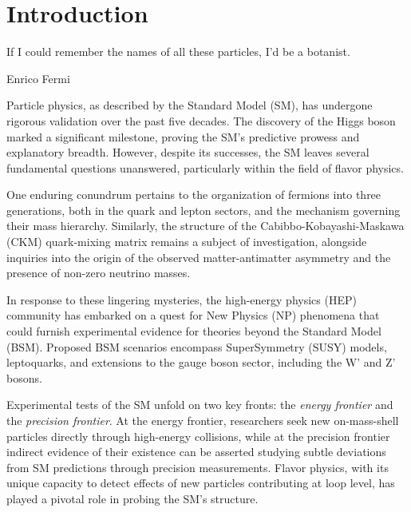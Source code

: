 \renewcommand{\chaptermark}[1]{\markboth{#1}{}}
\renewcommand{\sectionmark}[1]{\markright{#1}}
\fancyhead{} %
\fancyhead[LE]{\chaptername~\thechapter | \leftmark}
\fancyhead[RO]{\thesection~\rightmark}
\fancyfoot{} %
\fancyfoot[LE,RO]{\thepage}

    
\chapter{Introduction}
\label{chp:intro}
\epigraph{If I could remember the names of all these particles, I'd be a botanist.}{Enrico Fermi}

Particle physics, as described by the Standard Model (SM), has undergone rigorous validation over the past five decades. The discovery of the Higgs boson\cite{Aad_2012, Chatrchyan_2012} marked a significant milestone, proving the SM's predictive prowess and explanatory breadth. However, despite its successes, the SM leaves several fundamental questions unanswered, particularly within the field of flavor physics.

One enduring conundrum pertains to the organization of fermions into three generations, both in the quark and lepton sectors, and the mechanism governing their mass hierarchy. Similarly, the structure of the Cabibbo-Kobayashi-Maskawa (CKM) quark-mixing matrix remains a subject of investigation, alongside inquiries into the origin of the observed matter-antimatter asymmetry and the presence of non-zero neutrino masses.

In response to these lingering mysteries, the high-energy physics (HEP) community has embarked on a quest for New Physics (NP) phenomena that could furnish experimental evidence for theories beyond the Standard Model (BSM). Proposed BSM scenarios encompass SuperSymmetry (SUSY) models, leptoquarks, and extensions to the gauge boson sector, including the W’ and Z’ bosons.

Experimental tests of the SM unfold on two key fronts: the \textit{energy frontier} and the \textit{precision frontier}. At the energy frontier, researchers seek new on-mass-shell particles directly through high-energy collisions, while at the precision frontier indirect evidence of their existence can be asserted studying subtle deviations from SM predictions through precision measurements. Flavor physics, with its unique capacity to detect effects of new particles contributing at loop level, has played a pivotal role in probing the SM's structure.

